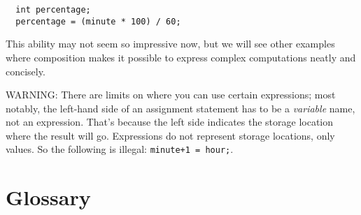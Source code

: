\begin{verbatim}
  int percentage;
  percentage = (minute * 100) / 60;
\end{verbatim}
%
This ability may not seem so impressive now, but we will see
other examples where composition makes it possible
to express complex computations neatly and concisely.

WARNING: There are limits on where you can use certain
expressions; most notably, the left-hand side of an assignment
statement has to be a {\em variable} name, not an expression.
That's because the left side indicates the storage location
where the result will go.  Expressions
do not represent storage locations, only values.  So the
following is illegal:  {\tt minute+1 = hour;}.

\section{Glossary}

